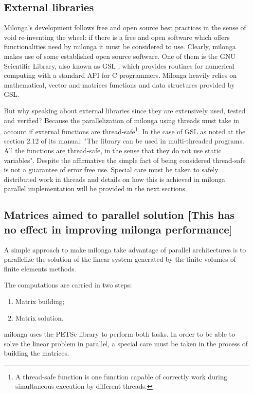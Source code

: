 \documentclass{anstrans}
\begin{document}
\subsection{External libraries}

Milonga's development follows free and open source best practices in the sense of void re-inventing the wheel:
if there is a free and open software which offers functionalities need by milonga it must be considered to use.
Clearly, milonga makes use of some established open source software. One of them is the GNU Scientific Library, also
known as GSL \cite{gsl2016}, which provides routines for numerical computing with a standard API for C
programmers. Milonga heavily relies on mathematical, vector and matrices functions and data structures provided
by GSL.

But why speaking about external libraries since they are extensively used, tested and verified? Because
the parallelization of milonga using threads must take in account if external functions are
thread-safe\footnote{A thread-safe function is one function capable of correctly work during simultaneous
  execution by different threads.}. In the case of GSL as noted at the section 2.12 of its manual: "The library can be used in multi-threaded programs. All the functions are thread-safe, in the sense that they do not use static variables". Despite the affirmative the
simple fact of being considered thread-safe is not a guarantee of error free use. Special care must be taken to safely
distributed work in threads and details on how this is achieved in milonga parallel implementation will be provided
in the next sections.

\subsection{Matrices aimed to parallel solution [This has no effect in improving milonga performance]}
A simple approach to make milonga take advantage of parallel architectures is to parallelize the
solution of the linear system generated by the finite volumes of finite elements methods.

The computations are carried in two steps:
\begin{enumerate}
\item Matrix building;
  \item Matrix solution.
\end{enumerate}

milonga uses the PETSc library to perform both tasks. In order to be able to solve the linear problem
in parallel, a special care must be taken in the process of building the matrices.
\end{document}
